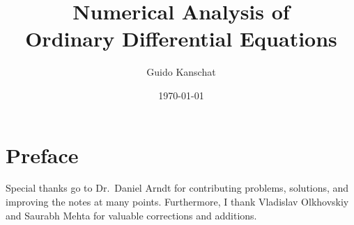 \usepackage[notref,notcite]{showkeys}
\usepackage{varioref}
\usepackage{nicefrac}
\usepackage[backend=biber,style=alphabetic]{biblatex}


\usetikzlibrary{snakes}

\title{\textbf{Numerical Analysis of\\ Ordinary Differential Equations}}
\author{Guido Kanschat}
\date{\today}

\def\rks{s}  %
\def\rka{a}  %
\def\rkb{b}  %
\def\rkc{c}  %
\def\rkg{g}  %

\def\lmms{s}

\def\rwaa{B_a}
\def\rwab{B_b}



\maketitle

\section*{Preface}
%


Special thanks go to Dr.~Daniel Arndt for contributing problems,
solutions, and improving the notes at many points. Furthermore, I
thank Vladislav Olkhovskiy and Saurabh Mehta for valuable corrections
and additions.
\thispagestyle{empty}
\setcounter{page}{0}

\tableofcontents








\appendix




\printbibliography
\printindex


